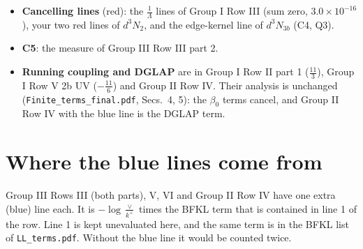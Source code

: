 \documentclass[10pt]{article}
\numberwithin{equation}{section}
\newcommand{\new}[1]{{\color{blue}#1}}
\newcommand{\old}[1]{{\color{red}#1}}
\begin{document}
\begin{itemize}
\item \textbf{Cancelling lines} (\old{red}): the $\frac{1}{\Lambda}$ lines of Group I Row III (sum zero, $3.0\times10^{-16}$), your two red lines of $d^3N_2$, and the edge-kernel line of $d^3N_{3b}$ (C4, Q3).
\item \textbf{C5}: the measure of Group III Row III part 2.
\item \textbf{Running coupling and DGLAP} are in Group I Row II part 1 ($\frac{11}{3}$), Group I Row V 2b UV ($-\frac{11}{6}$) and Group II Row IV. Their analysis is unchanged (\texttt{Finite\_terms\_final.pdf}, Secs.~4, 5): the $\beta_0$ terms cancel, and Group II Row IV with the blue line is the DGLAP term.
\end{itemize}

\section{Where the blue lines come from}\label{sec:blue}
Group III Rows III (both parts), V, VI and Group II Row IV have one extra (\new{blue}) line each. It is $-\log\frac{\vee}{k^+}$ times the BFKL term that is contained in line 1 of the row. Line 1 is kept unevaluated here, and the same term is in the BFKL list of \texttt{LL\_terms.pdf}. Without the blue line it would be counted twice.
\end{document}
